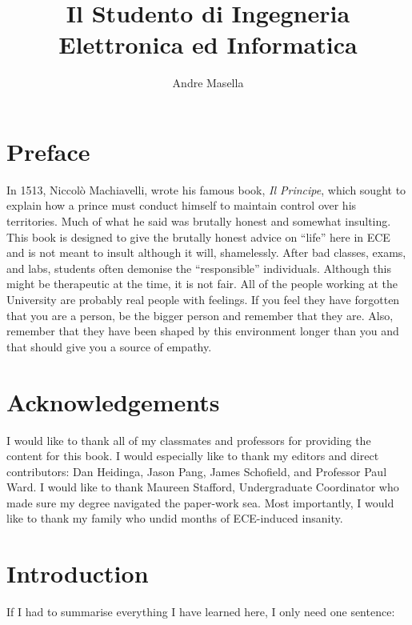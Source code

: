 \documentclass{book}
\author{Andre Masella}
\title{Il Studento di Ingegneria\\ Elettronica ed Informatica}
\begin{document}
\newcommand{\tip}[1]{\vfil\medskip\noindent\hfil\colorbox[gray]{0.85}{\parbox{0.8\textwidth}{\lettrine[image=true,lines=3]{tip}{} #1 \smallskip}}\hfil\par\medskip\vfil}
\frontmatter

\maketitle
\tableofcontents
\listoffigures

\chapter*{Preface}
In 1513, Niccol\`o Machiavelli, wrote his famous book, \textsl{Il Principe}, which sought to explain how a prince must conduct himself to maintain control over his territories. Much of what he said was brutally honest and somewhat insulting. This book is designed to give the brutally honest advice on ``life'' here in ECE and is not meant to insult although it will, shamelessly. After bad classes, exams, and labs, students often demonise the ``responsible'' individuals. Although this might be therapeutic at the time, it is not fair. All of the people working at the University are probably real people with feelings. If you feel they have forgotten that you are a person, be the bigger person and remember that they are. Also, remember that they have been shaped by this environment longer than you and that should give you a source of empathy.

\chapter*{Acknowledgements}
I would like to thank all of my classmates and professors for providing the content for this book. I would especially like to thank my editors and direct contributors: Dan Heidinga, Jason Pang, James Schofield, and Professor Paul Ward. I would like to thank Maureen Stafford, Undergraduate Coordinator who made sure my degree navigated the paper-work sea. Most importantly, I would like to thank my family who undid months of ECE-induced insanity.

\mainmatter

\chapter{Introduction}
If I had to summarise everything I have learned here, I only need one sentence:
\end{document}
